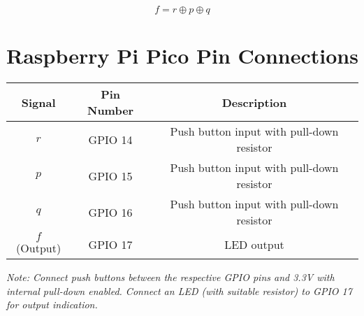 \documentclass{article}
\begin{document}
\[
\boxed{
f = r \oplus p \oplus q
}
\]

\bigskip

\section*{Raspberry Pi Pico Pin Connections}

\begin{tabular}{|c|c|c|}
\hline
\textbf{Signal} & \textbf{Pin Number} & \textbf{Description} \\
\hline
\(r\) & GPIO 14 & Push button input with pull-down resistor \\
\(p\) & GPIO 15 & Push button input with pull-down resistor \\
\(q\) & GPIO 16 & Push button input with pull-down resistor \\
\(f\) (Output) & GPIO 17 & LED output \\
\hline
\end{tabular}

\bigskip
\textit{Note: Connect push buttons between the respective GPIO pins and 3.3V with internal pull-down enabled. Connect an LED (with suitable resistor) to GPIO 17 for output indication.}
\end{document}
